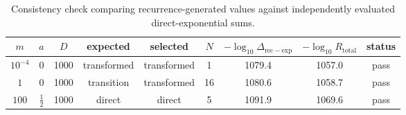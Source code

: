 \begin{table}[t]
\centering
\small
\begin{tabular}{c c c c c c c c c}
\hline
$m$ & $a$ & $D$ & expected & selected & $N$ & $-\log_{10}\Delta_{\mathrm{rec-exp}}$ & $-\log_{10}R_{\mathrm{total}}$ & status \\
\hline
$10^{-4}$ & $0$ & 1000 & transformed & transformed & 1 & 1079.4 & 1057.0 & pass \\
$1$ & $0$ & 1000 & transition & transformed & 16 & 1080.6 & 1058.7 & pass \\
$100$ & $\frac12$ & 1000 & direct & direct & 5 & 1091.9 & 1069.6 & pass \\
\hline
\end{tabular}
\caption{Consistency check comparing recurrence-generated values against independently evaluated direct-exponential sums.}
\label{tab:rec-vs-exp}
\end{table}
